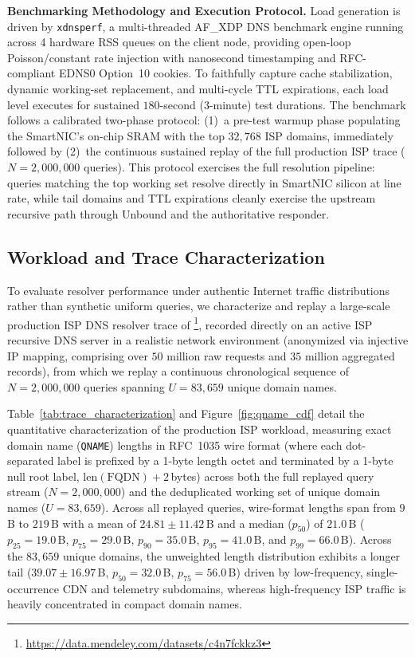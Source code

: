 \documentclass[a4paper,fleqn,colorlinks,hidelinks]{cas-sc}
\begin{document}
\textbf{Benchmarking Methodology and Execution Protocol.} Load generation is driven by \texttt{xdnsperf}, a multi-threaded AF\_XDP DNS benchmark engine running across 4 hardware RSS queues on the client node, providing open-loop Poisson/constant rate injection with nanosecond timestamping and RFC-compliant EDNS0 Option~10 cookies. To faithfully capture cache stabilization, dynamic working-set replacement, and multi-cycle TTL expirations, each load level executes for sustained $180$-second ($3$-minute) test durations. The benchmark follows a calibrated two-phase protocol: (1)~a pre-test warmup phase populating the SmartNIC's on-chip SRAM with the top $32{,}768$ ISP domains, immediately followed by (2)~the continuous sustained replay of the full production ISP trace ($N = 2{,}000{,}000$ queries). This protocol exercises the full resolution pipeline: queries matching the top working set resolve directly in SmartNIC silicon at line rate, while tail domains and TTL expirations cleanly exercise the upstream recursive path through Unbound and the authoritative responder.

\subsection{Workload and Trace Characterization}
\label{sec:trace_characterization}

To evaluate resolver performance under authentic Internet traffic distributions rather than synthetic uniform queries, we characterize and replay a large-scale production ISP DNS resolver trace of \citet{11314363}\footnote{\url{https://data.mendeley.com/datasets/c4n7fckkz3}}, recorded directly on an active ISP recursive DNS server in a realistic network environment (anonymized via injective IP mapping, comprising over $50$ million raw requests and $35$ million aggregated records), from which we replay a continuous chronological sequence of $N = 2{,}000{,}000$ queries spanning $U = 83{,}659$ unique domain names.

Table~\ref{tab:trace_characterization} and Figure~\ref{fig:qname_cdf} detail the quantitative characterization of the production ISP workload, measuring exact domain name (\texttt{QNAME}) lengths in RFC~1035 wire format (where each dot-separated label is prefixed by a 1-byte length octet and terminated by a 1-byte null root label, $\text{len}(\text{FQDN}) + 2$\,bytes) across both the full replayed query stream ($N = 2{,}000{,}000$) and the deduplicated working set of unique domain names ($U = 83{,}659$). Across all replayed queries, wire-format lengths span from $9$\,B to $219$\,B with a mean of $24.81 \pm 11.42$\,B and a median ($p_{50}$) of $21.0$\,B ($p_{25}=19.0$\,B, $p_{75}=29.0$\,B, $p_{90}=35.0$\,B, $p_{95}=41.0$\,B, and $p_{99}=66.0$\,B). Across the $83{,}659$ unique domains, the unweighted length distribution exhibits a longer tail ($39.07 \pm 16.97$\,B, $p_{50}=32.0$\,B, $p_{75}=56.0$\,B) driven by low-frequency, single-occurrence CDN and telemetry subdomains, whereas high-frequency ISP traffic is heavily concentrated in compact domain names.
\end{document}
